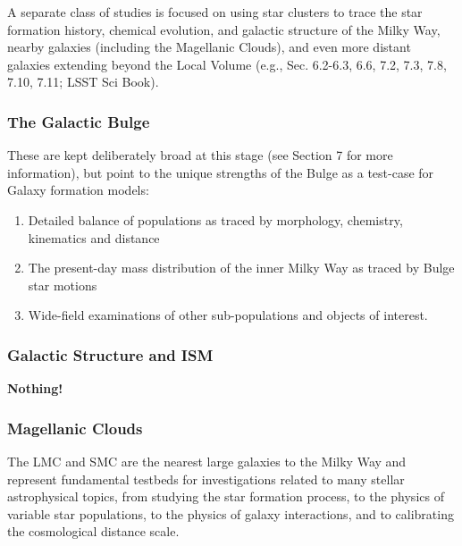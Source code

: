 A separate class of studies is focused on using star clusters to trace the star formation history, chemical evolution, and galactic structure of the Milky Way, nearby galaxies (including the Magellanic Clouds), and even more distant galaxies extending beyond the Local Volume (e.g., Sec. 6.2-6.3, 6.6, 7.2, 7.3, 7.8, 7.10, 7.11; LSST Sci Book). 

\subsubsection{The Galactic Bulge}

These are kept deliberately broad at this stage (see Section 7 for more information), but point to the unique strengths of the Bulge as a test-case for Galaxy formation models: 
\begin{enumerate}
\item Detailed balance of populations as traced by morphology, chemistry, kinematics and distance 
\item The present-day mass distribution of the inner Milky Way as traced by Bulge star motions 
\item Wide-field examinations of other sub-populations and objects of interest. 
\end{enumerate}

\subsubsection{Galactic Structure and ISM}

{\bf Nothing!}

\subsubsection{Magellanic Clouds}

The LMC and SMC are the nearest large galaxies to the Milky Way and represent  fundamental testbeds for investigations related to many stellar astrophysical topics,  from studying the star formation process, to the physics of variable star populations,  to the physics of galaxy interactions, and to calibrating the cosmological distance  scale.    

